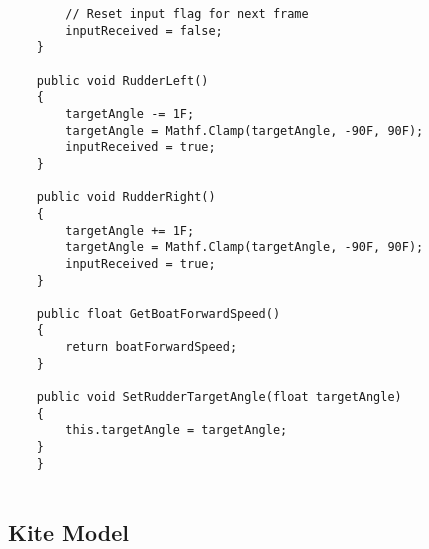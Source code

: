 \begin{lstlisting}
        // Reset input flag for next frame
        inputReceived = false;
    }

    public void RudderLeft()
    {
        targetAngle -= 1F;
        targetAngle = Mathf.Clamp(targetAngle, -90F, 90F);
        inputReceived = true;
    }

    public void RudderRight()
    {
        targetAngle += 1F;
        targetAngle = Mathf.Clamp(targetAngle, -90F, 90F);
        inputReceived = true;
    }

    public float GetBoatForwardSpeed()
    {
        return boatForwardSpeed;
    }

    public void SetRudderTargetAngle(float targetAngle)
    {
        this.targetAngle = targetAngle;
    }
    }
    
\end{lstlisting}
\subsection{Kite Model}\label{sec:kite}
